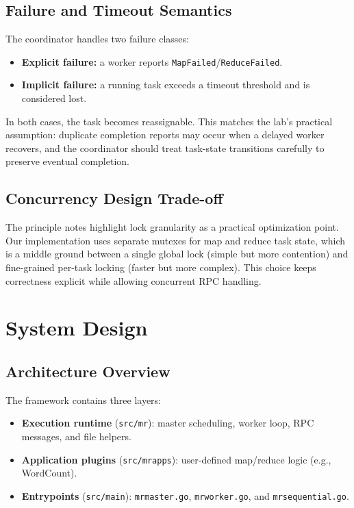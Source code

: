\documentclass[12pt]{article}
\begin{document}
\subsection{Failure and Timeout Semantics}
The coordinator handles two failure classes:
\begin{itemize}[leftmargin=1.5em]
  \item \textbf{Explicit failure:} a worker reports \texttt{MapFailed}/\texttt{ReduceFailed}.
  \item \textbf{Implicit failure:} a running task exceeds a timeout threshold and is considered lost.
\end{itemize}
In both cases, the task becomes reassignable. This matches the lab's practical assumption: duplicate completion reports may occur when a delayed worker recovers, and the coordinator should treat task-state transitions carefully to preserve eventual completion.

\subsection{Concurrency Design Trade-off}
The principle notes highlight lock granularity as a practical optimization point. Our implementation uses separate mutexes for map and reduce task state, which is a middle ground between a single global lock (simple but more contention) and fine-grained per-task locking (faster but more complex). This choice keeps correctness explicit while allowing concurrent RPC handling.

\section{System Design}
\subsection{Architecture Overview}
The framework contains three layers:
\begin{itemize}[leftmargin=1.5em]
  \item \textbf{Execution runtime} (\texttt{src/mr}): master scheduling, worker loop, RPC messages, and file helpers.
  \item \textbf{Application plugins} (\texttt{src/mrapps}): user-defined map/reduce logic (e.g., WordCount).
  \item \textbf{Entrypoints} (\texttt{src/main}): \texttt{mrmaster.go}, \texttt{mrworker.go}, and \texttt{mrsequential.go}.
\end{itemize}
\end{document}
